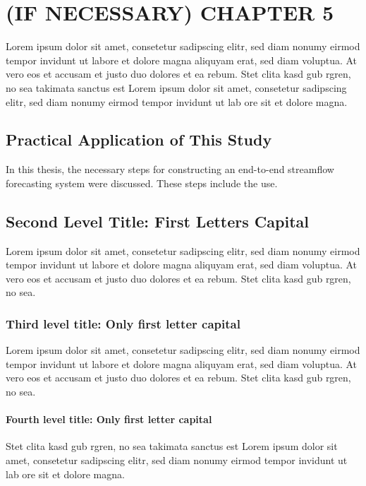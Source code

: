 \chapter{(IF NECESSARY) CHAPTER 5}\label{Ch5}

Lorem ipsum dolor sit amet, consetetur sadipscing elitr, sed diam nonumy eirmod tempor invidunt ut labore et dolore magna aliquyam erat, sed diam voluptua. At vero eos et accusam et justo duo dolores et ea rebum. Stet clita kasd gub rgren, no sea takimata sanctus est Lorem ipsum dolor sit amet, consetetur sadipscing elitr, sed diam nonumy eirmod tempor invidunt ut lab ore sit et dolore magna.

\section{Practical Application of This Study}

In this thesis, the necessary steps for constructing an end-to-end streamflow forecasting system were discussed. These steps include the use.

\section{Second Level Title: First Letters Capital}

Lorem ipsum dolor sit amet, consetetur sadipscing elitr, sed diam nonumy eirmod tempor invidunt ut labore et dolore magna aliquyam erat, sed diam voluptua. At vero eos et accusam et justo duo dolores et ea rebum. Stet clita kasd gub rgren, no sea.

\subsection{Third level title: Only first letter capital}

Lorem ipsum dolor sit amet, consetetur sadipscing elitr, sed diam nonumy eirmod tempor invidunt ut labore et dolore magna aliquyam erat, sed diam voluptua. At vero eos et accusam et justo duo dolores et ea rebum. Stet clita kasd gub rgren, no sea.

\subsubsection{Fourth level title: Only first letter capital}

Stet clita kasd gub rgren, no sea takimata sanctus est Lorem ipsum dolor sit amet, consetetur sadipscing elitr, sed diam nonumy eirmod tempor invidunt ut lab ore sit et dolore magna.

